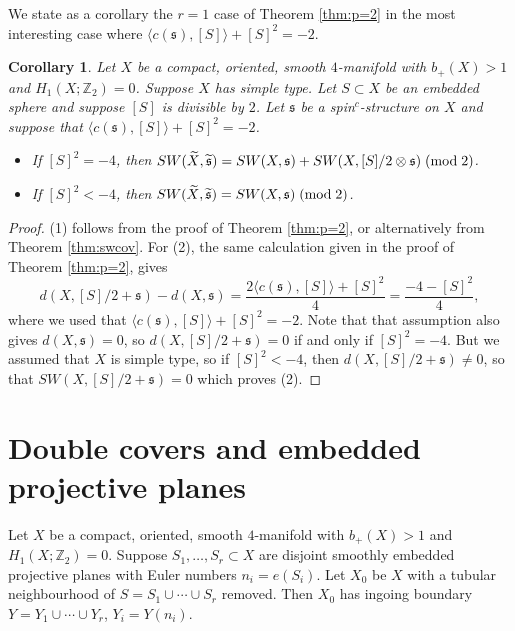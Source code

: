 \documentclass{amsart}
\newtheorem{corollary}[theorem]{Corollary}
\theoremstyle{definition}
\theoremstyle{remark}
\numberwithin{equation}{section}
\begin{document}
We state as a corollary the $r=1$ case of Theorem \ref{thm:p=2} in the most interesting case where $\langle c(\mathfrak{s}) , [S] \rangle + [S]^2 = -2$.

\begin{corollary}
Let $X$ be a compact, oriented, smooth $4$-manifold with $b_+(X) > 1$ and $H_1(X ; \mathbb{Z}_2) = 0$. Suppose $X$ has simple type. Let $S \subset X$ be an embedded sphere and suppose $[S]$ is divisible by $2$. Let $\mathfrak{s}$ be a spin$^c$-structure on $X$ and suppose that $\langle c(\mathfrak{s}) , [S] \rangle + [S]^2 = -2$.
\begin{itemize}
\item[(1)]{If $[S]^2 = -4$, then $SW(\widetilde{X} , \widetilde{\mathfrak{s}}) = SW(X , \mathfrak{s}) + SW(X , [S]/2 \otimes \mathfrak{s}) \; ({\rm mod} \; 2)$.}
\item[(2)]{If $[S]^2 < -4$, then $SW(\widetilde{X} , \widetilde{\mathfrak{s}}) = SW(X , \mathfrak{s}) \; ({\rm mod} \; 2)$.}
\end{itemize}
\end{corollary}
\begin{proof}
(1) follows from the proof of Theorem \ref{thm:p=2}, or alternatively from Theorem \ref{thm:swcov}. For (2), the same calculation given in the proof of Theorem \ref{thm:p=2}, gives
\[
d(X , [S]/2 + \mathfrak{s}) - d(X , \mathfrak{s}) =  \frac{ 2\langle c(\mathfrak{s}) , [S] \rangle + [S]^2 }{4} = \frac{-4 - [S]^2}{4},
\]
where we used that $\langle c(\mathfrak{s}) , [S] \rangle + [S]^2 = -2$. Note that that assumption also gives $d(X , \mathfrak{s}) = 0$, so $d(X , [S]/2 + \mathfrak{s}) = 0$ if and only if $[S]^2 = -4$. But we assumed that $X$ is simple type, so if $[S]^2 < -4$, then $d(X , [S]/2 + \mathfrak{s}) \neq 0$, so that $SW(X , [S]/2 + \mathfrak{s}) = 0$ which proves (2).
\end{proof}




\section{Double covers and embedded projective planes}\label{sec:rp2}

Let $X$ be a compact, oriented, smooth $4$-manifold with $b_+(X) > 1$ and $H_1(X ; \mathbb{Z}_2) = 0$. Suppose $S_1, \dots , S_r \subset X$ are disjoint smoothly embedded projective planes with Euler numbers $n_i = e(S_i)$. Let $X_0$ be $X$ with a tubular neighbourhood of $S = S_1 \cup \cdots \cup S_r$ removed. Then $X_0$ has ingoing boundary $Y = Y_1 \cup \cdots \cup Y_r$, $Y_i = Y(n_i)$.
\end{document}
